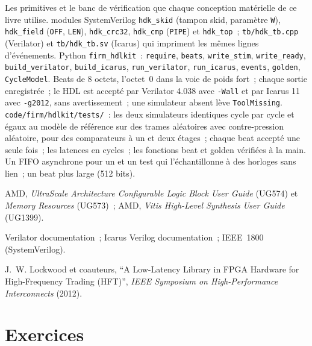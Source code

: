\begin{build}
 Les primitives et le banc de vérification que chaque conception matérielle de ce livre utilise.
 modules SystemVerilog \texttt{hdk\_skid} (tampon skid, paramètre \texttt{W}), \texttt{hdk\_field} (\texttt{OFF},
\texttt{LEN}), \texttt{hdk\_crc32}, \texttt{hdk\_cmp} (\texttt{PIPE}) et \texttt{hdk\_top}~;  \texttt{tb/hdk\_tb.cpp} (Verilator)
et \texttt{tb/hdk\_tb.sv} (Icarus) qui impriment les mêmes lignes d'événements. Python \texttt{firm\_hdlkit}~: \texttt{require}, \texttt{beats},
\texttt{write\_stim}, \texttt{write\_ready}, \texttt{build\_verilator}, \texttt{build\_icarus}, \texttt{run\_verilator},
\texttt{run\_icarus}, \texttt{events}, \texttt{golden}, \texttt{CycleModel}.
 Beats de 8 octets, l'octet~0 dans la voie de poids fort~; chaque sortie enregistrée~; le HDL est accepté par Verilator 4.038 avec
\texttt{-Wall} et par Icarus 11 avec \texttt{-g2012}, sans avertissement~; une simulateur absent lève \texttt{ToolMissing}.
 \texttt{code/firm/hdlkit/tests/}~: les deux simulateurs identiques cycle par cycle et égaux au modèle de référence sur des
trames aléatoires avec contre-pression aléatoire, pour des comparateurs à un et deux étages~; chaque beat accepté une seule fois~; les latences en
cycles~; les fonctions beat et golden vérifiées à la main.
 Un FIFO asynchrone pour un  et un test qui l'échantillonne à des horloges sans lien~; un beat plus large (512 bits).
\end{build}

\begin{omsources}
\item AMD, \emph{UltraScale Architecture Configurable Logic Block User Guide} (UG574) et \emph{Memory Resources} (UG573)~; AMD, \emph{Vitis
High-Level Synthesis User Guide} (UG1399).
\item Verilator documentation~; Icarus Verilog documentation~; IEEE~1800 (SystemVerilog).
\item J.~W. Lockwood et coauteurs, ``A Low-Latency Library in FPGA Hardware for High-Frequency Trading (HFT)'', \emph{IEEE Symposium on
High-Performance Interconnects} (2012).
\end{omsources}

\section{Exercices}

